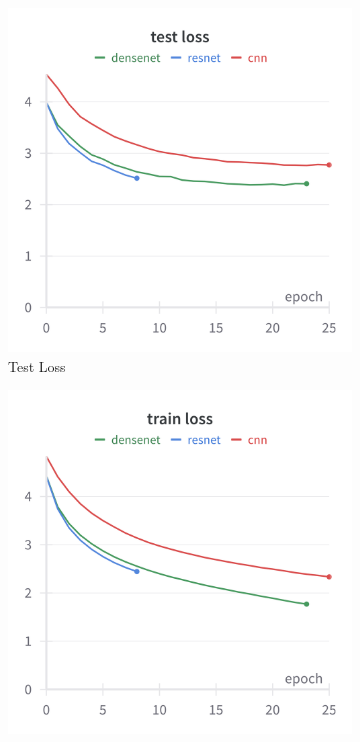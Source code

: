\documentclass[twocolumn,superscriptaddress,aps]{revtex4-1}
\begin{document}
\begin{figure}[H]
    \centering
    \begin{subfigure}{0.235 \textwidth}
        \includegraphics[width = 0.99 \textwidth]{images/205classes_test.png}
        \caption{Test Loss}
    \end{subfigure}
    \begin{subfigure}{0.235 \textwidth}
        \includegraphics[width = 0.99 \textwidth]{images/205classes_train.png}

\end{subfigure}
\end{figure}
\end{document}
